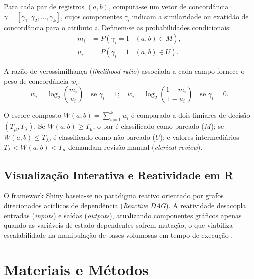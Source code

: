 \documentclass[sigconf, nonacm, screen, language=portuguese, language=spanish, language={main=english}]{acmart}
\begin{document}
Para cada par de registros $(a, b)$, computa-se um vetor de concordância $\gamma = [\gamma_1, \gamma_2, \dots, \gamma_k]$, cujos componentes $\gamma_i$ indicam a similaridade ou exatidão de concordância para o atributo $i$. Definem-se as probabilidades condicionais:
\begin{align}
m_i &= P(\gamma_i = 1 \mid (a,b) \in M), \\
u_i &= P(\gamma_i = 1 \mid (a,b) \in U).
\end{align}

A razão de verossimilhança (\textit{likelihood ratio}) associada a cada campo fornece o peso de concordância $w_i$:
\begin{equation}
w_i = \log_2 \left( \frac{m_i}{u_i} \right) \quad \text{se } \gamma_i = 1; \quad
w_i = \log_2 \left( \frac{1 - m_i}{1 - u_i} \right) \quad \text{se } \gamma_i = 0.
\end{equation}

O escore composto $W(a,b) = \sum_{i=1}^k w_i$ é comparado a dois limiares de decisão $(T_{\mu}, T_{\lambda})$. Se $W(a,b) \ge T_{\mu}$, o par é classificado como pareado ($M$); se $W(a,b) \le T_{\lambda}$, é classificado como não pareado ($U$); e valores intermediários $T_{\lambda} < W(a,b) < T_{\mu}$ demandam revisão manual (\textit{clerical review}).

\subsection{Visualização Interativa e Reatividade em R}
O framework Shiny baseia-se no paradigma reativo orientado por grafos direcionados acíclicos de dependência (\textit{Reactive DAG}). A reatividade desacopla entradas (\textit{inputs}) e saídas (\textit{outputs}), atualizando componentes gráficos apenas quando as variáveis de estado dependentes sofrem mutação, o que viabiliza escalabilidade na manipulação de bases volumosas em tempo de execução \cite{shiny2024}.

\section{Materiais e Métodos}\label{sec:metodologia}
\end{document}
